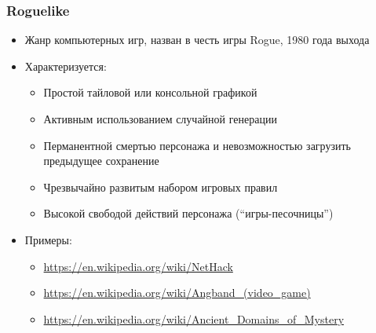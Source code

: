 \documentclass{../../slides-style}
\begin{document}
    \begin{frame}[plain]
        \titlepage
    \end{frame}


    \begin{frame}
        \frametitle{Roguelike}
        \begin{itemize}
            \item Жанр компьютерных игр, назван в честь игры Rogue, 1980 года выхода
            \item Характеризуется:
            \begin{itemize}
                \item Простой тайловой или консольной графикой
                \item Активным использованием случайной генерации
                \item Перманентной смертью персонажа и невозможностью загрузить предыдущее сохранение
                \item Чрезвычайно развитым набором игровых правил
                \item Высокой свободой действий персонажа (``игры-песочницы'')
            \end{itemize}
            \item Примеры:
            \begin{itemize}
                \item \url{https://en.wikipedia.org/wiki/NetHack}
                \item \url{https://en.wikipedia.org/wiki/Angband_(video_game)}
                \item \url{https://en.wikipedia.org/wiki/Ancient_Domains_of_Mystery}
            \end{itemize}
        \end{itemize}
    \end{frame}
\end{document}
